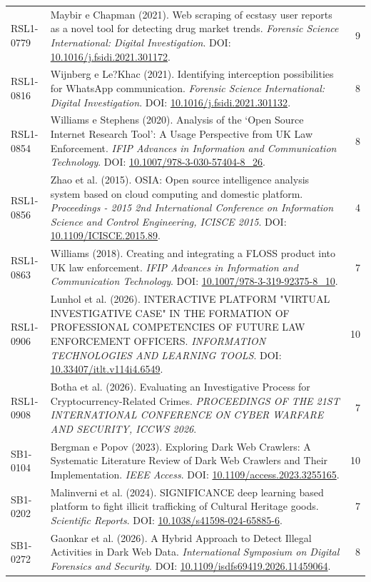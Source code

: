 \begin{small}
\begin{longtable}{lp{11.2cm}r}
RSL1-0779 & Maybir e Chapman (2021). Web scraping of ecstasy user reports as a novel tool for detecting drug market trends. \textit{Forensic Science International: Digital Investigation}. DOI: \url{10.1016/j.fsidi.2021.301172}. & 9 \\
RSL1-0816 & Wijnberg e Le?Khac (2021). Identifying interception possibilities for WhatsApp communication. \textit{Forensic Science International: Digital Investigation}. DOI: \url{10.1016/j.fsidi.2021.301132}. & 8 \\
RSL1-0854 & Williams e Stephens (2020). Analysis of the ‘Open Source Internet Research Tool’: A Usage Perspective from UK Law Enforcement. \textit{IFIP Advances in Information and Communication Technology}. DOI: \url{10.1007/978-3-030-57404-8_26}. & 8 \\
RSL1-0856 & Zhao et al. (2015). OSIA: Open source intelligence analysis system based on cloud computing and domestic platform. \textit{Proceedings - 2015 2nd International Conference on Information Science and Control Engineering, ICISCE 2015}. DOI: \url{10.1109/ICISCE.2015.89}. & 4 \\
RSL1-0863 & Williams (2018). Creating and integrating a FLOSS product into UK law enforcement. \textit{IFIP Advances in Information and Communication Technology}. DOI: \url{10.1007/978-3-319-92375-8_10}. & 7 \\
RSL1-0906 & Lunhol et al. (2026). INTERACTIVE PLATFORM "VIRTUAL INVESTIGATIVE CASE" IN THE FORMATION OF PROFESSIONAL COMPETENCIES OF FUTURE LAW ENFORCEMENT OFFICERS. \textit{INFORMATION TECHNOLOGIES AND LEARNING TOOLS}. DOI: \url{10.33407/itlt.v114i4.6549}. & 10 \\
RSL1-0908 & Botha et al. (2026). Evaluating an Investigative Process for Cryptocurrency-Related Crimes. \textit{PROCEEDINGS OF THE 21ST INTERNATIONAL CONFERENCE ON CYBER WARFARE AND SECURITY, ICCWS 2026}. & 7 \\
SB1-0104 & Bergman e Popov (2023). Exploring Dark Web Crawlers: A Systematic Literature Review of Dark Web Crawlers and Their Implementation. \textit{IEEE Access}. DOI: \url{10.1109/access.2023.3255165}. & 10 \\
SB1-0202 & Malinverni et al. (2024). SIGNIFICANCE deep learning based platform to fight illicit trafficking of Cultural Heritage goods. \textit{Scientific Reports}. DOI: \url{10.1038/s41598-024-65885-6}. & 7 \\
SB1-0272 & Gaonkar et al. (2026). A Hybrid Approach to Detect Illegal Activities in Dark Web Data. \textit{International Symposium on Digital Forensics and Security}. DOI: \url{10.1109/isdfs69419.2026.11459064}. & 8 \\

\end{longtable}
\end{small}
